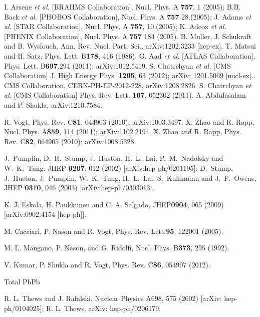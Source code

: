 \documentclass[aps,prc,preprint,superscriptaddress,showpacs,showkeys]{revtex4-1}
\begin{document}
\noindent
\begin{thebibliography}{100}
\medskip
{} I. Arsene {\it et al.} [BRAHMS Collaboration], Nucl. Phys. A {\bf 757}, 1 (2005); 
  B.B. Back {\it et al.} [PHOBOS Collaboration], Nucl. Phys. A {\bf 757} 28.(2005); 
  J. Adams {\it et al.} [STAR Collaboration], Nucl. Phys. A {\bf 757}, 10.(2005); 
  K. Adcox {\it et al.} [PHENIX Collaboration], Nucl. Phys. A {\bf 757} 184 (2005).
 B. Muller, J. Schukraft and B. Wyslouch, Ann. Rev. Nucl. Part. Sci., arXiv:1202.3233 [hep-ex].
 T. Matsui and H. Satz, Phys. Lett. B{\bf 178}, 416 (1986).
 G. Aad {\it et al.} [ATLAS Collaboration], Phys. Lett. B{\bf 697},294 (2011); arXiv:1012.5419.
 S. Chatrchyan {\it et al.} [CMS Collaboration]
 J. High Energy Phys. {\bf 1205}, 63 (2012);  arXiv: 1201.5069 [nucl-ex]..
 CMS Collaboration, CERN-PH-EP-2012-228, arXiv:1208.2826.
 S. Chatrchyan {\it et al.} [CMS Collaboration] Phys. Rev. Lett. {\bf 107}, 052302 (2011).
 A. Abdulasalam and P. Shukla, arXiv:1210.7584.

 R. Vogt, Phys. Rev. C{\bf 81}, 044903 (2010); arXiv:1003.3497.
 X. Zhao and R. Rapp, Nucl. Phys. A{\bf 859}, 114 (2011); arXiv:1102.2194. 
 X. Zhao and R. Rapp, Phys. Rev. C{\bf 82}, 064905 (2010); arXiv:1008.5328.

 J.~Pumplin, D.~R.~Stump, J.~Huston, H.~L.~Lai, P.~M.~Nadolsky 
and W.~K.~Tung,  JHEP {\bf 0207}, 012 (2002) [arXiv:hep-ph/0201195];
  D.~Stump, J.~Huston, J.~Pumplin, W.~K.~Tung, H.~L.~Lai, S.~Kuhlmann  and J.~F.~Owens,
  JHEP {\bf 0310}, 046 (2003)  [arXiv:hep-ph/0303013].

 K. J. Eskola, H. Paukkunen and C. A. Salgado, JHEP{\bf 0904}, 065 (2009) [arXiv:0902.4154 [hep-ph]].

 M. Cacciari, P. Nason and R. Vogt, Phys. Rev. Lett.{\bf 95}, 122001 (2005).

 M. L. Mangano, P. Nason, and G. Ridolfi, Nucl. Phys. B{\bf 373}, 295 (1992).

 V. Kumar, P. Shukla and R. Vogt, Phys. Rev. C{\bf 86}, 054907 (2012).

 Total PbPb

 R. L. Thews and J. Rafalski, Nuclear Physics A698, 575 (2002) [arXiv: hep-ph/0104025];
               R. L. Thews, arXiv: hep-ph/0206179.


\end{thebibliography}
\end{document}
